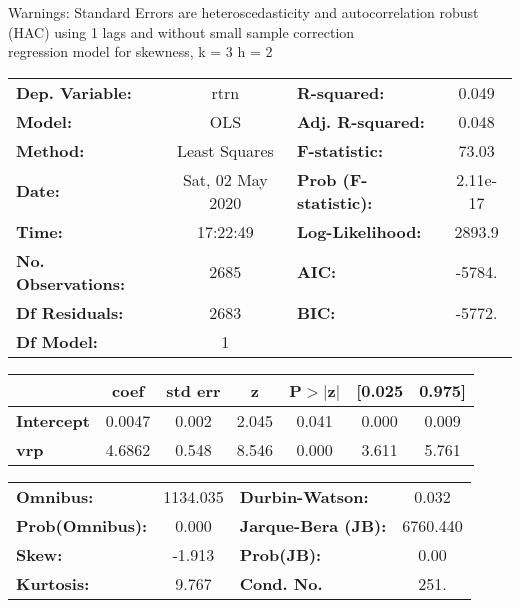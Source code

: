 Warnings: \newline
 [1] Standard Errors are heteroscedasticity and autocorrelation robust (HAC) using 1 lags and without small sample correction\\ 

regression model for skewness, k = 3 h = 2\begin{center}
\begin{tabular}{lclc}
\toprule
\textbf{Dep. Variable:}    &       rtrn       & \textbf{  R-squared:         } &     0.049   \\
\textbf{Model:}            &       OLS        & \textbf{  Adj. R-squared:    } &     0.048   \\
\textbf{Method:}           &  Least Squares   & \textbf{  F-statistic:       } &     73.03   \\
\textbf{Date:}             & Sat, 02 May 2020 & \textbf{  Prob (F-statistic):} &  2.11e-17   \\
\textbf{Time:}             &     17:22:49     & \textbf{  Log-Likelihood:    } &    2893.9   \\
\textbf{No. Observations:} &        2685      & \textbf{  AIC:               } &    -5784.   \\
\textbf{Df Residuals:}     &        2683      & \textbf{  BIC:               } &    -5772.   \\
\textbf{Df Model:}         &           1      & \textbf{                     } &             \\
\bottomrule
\end{tabular}
\begin{tabular}{lcccccc}
                   & \textbf{coef} & \textbf{std err} & \textbf{z} & \textbf{P$> |$z$|$} & \textbf{[0.025} & \textbf{0.975]}  \\
\midrule
\textbf{Intercept} &       0.0047  &        0.002     &     2.045  &         0.041        &        0.000    &        0.009     \\
\textbf{vrp}       &       4.6862  &        0.548     &     8.546  &         0.000        &        3.611    &        5.761     \\
\bottomrule
\end{tabular}
\begin{tabular}{lclc}
\textbf{Omnibus:}       & 1134.035 & \textbf{  Durbin-Watson:     } &    0.032  \\
\textbf{Prob(Omnibus):} &   0.000  & \textbf{  Jarque-Bera (JB):  } & 6760.440  \\
\textbf{Skew:}          &  -1.913  & \textbf{  Prob(JB):          } &     0.00  \\
\textbf{Kurtosis:}      &   9.767  & \textbf{  Cond. No.          } &     251.  \\
\bottomrule
\end{tabular}
\end{center}

